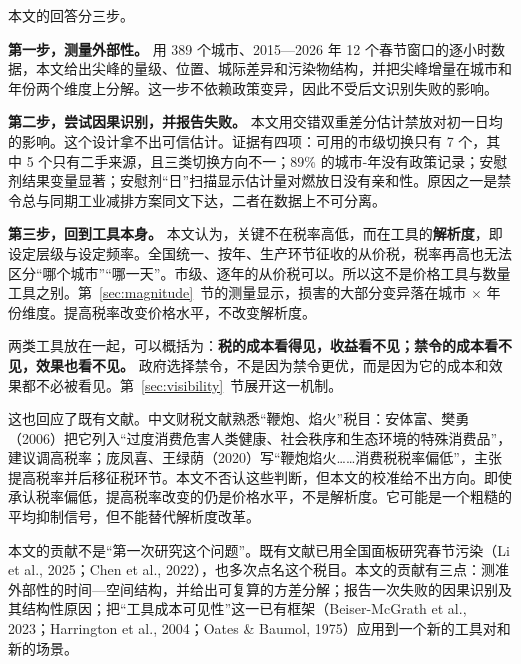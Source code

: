 本文的回答分三步。

\textbf{第一步，测量外部性。} 用 389 个城市、2015—2026 年 12 个春节窗口的逐小时数据，本文给出尖峰的量级、位置、城际差异和污染物结构，并把尖峰增量在城市和年份两个维度上分解。这一步不依赖政策变异，因此不受后文识别失败的影响。

\textbf{第二步，尝试因果识别，并报告失败。} 本文用交错双重差分估计禁放对初一日均  的影响。这个设计拿不出可信估计。证据有四项：可用的市级切换只有 7 个，其中 5 个只有二手来源，且三类切换方向不一；89\% 的城市-年没有政策记录；安慰剂结果变量显著；安慰剂“日”扫描显示估计量对燃放日没有亲和性。原因之一是禁令总与同期工业减排方案同文下达，二者在数据上不可分离。

\textbf{第三步，回到工具本身。} 本文认为，关键不在税率高低，而在工具的\textbf{解析度}，即设定层级与设定频率。全国统一、按年、生产环节征收的从价税，税率再高也无法区分“哪个城市”“哪一天”。市级、逐年的从价税可以。所以这不是价格工具与数量工具之别。第~\ref{sec:magnitude}~节的测量显示，损害的大部分变异落在城市 $\times$ 年份维度。提高税率改变价格水平，不改变解析度。

两类工具放在一起，可以概括为：\textbf{税的成本看得见，收益看不见；禁令的成本看不见，效果也看不见。} 政府选择禁令，不是因为禁令更优，而是因为它的成本和效果都不必被看见。第~\ref{sec:visibility}~节展开这一机制。

这也回应了既有文献。中文财税文献熟悉“鞭炮、焰火”税目：安体富、樊勇（2006）把它列入“过度消费危害人类健康、社会秩序和生态环境的特殊消费品”，建议调高税率；庞凤喜、王绿荫（2020）写“鞭炮焰火……消费税税率偏低”，主张提高税率并后移征税环节。本文不否认这些判断，但本文的校准给不出方向。即使承认税率偏低，提高税率改变的仍是价格水平，不是解析度。它可能是一个粗糙的平均抑制信号，但不能替代解析度改革。

本文的贡献不是“第一次研究这个问题”。既有文献已用全国面板研究春节污染（Li et al., 2025；Chen et al., 2022），也多次点名这个税目。本文的贡献有三点：测准外部性的时间—空间结构，并给出可复算的方差分解；报告一次失败的因果识别及其结构性原因；把“工具成本可见性”这一已有框架（Beiser-McGrath et al., 2023；Harrington et al., 2004；Oates \& Baumol, 1975）应用到一个新的工具对和新的场景。
